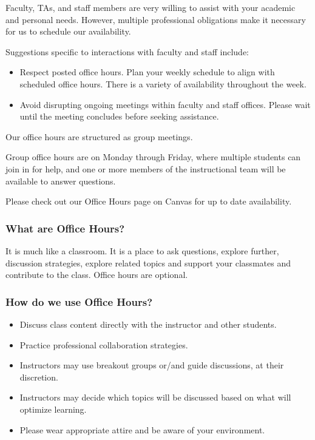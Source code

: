 Faculty, TAs, and staff members are very willing to assist with your academic and personal needs. However, multiple professional obligations make it necessary for us to schedule our availability.

Suggestions specific to interactions with faculty and staff include:

\begin{itemize}
    \item Respect posted office hours.
        Plan your weekly schedule to align with scheduled office hours. There is a variety of availability throughout the week.
    \item Avoid disrupting ongoing meetings within faculty and staff offices.
        Please wait until the meeting concludes before seeking assistance.
\end{itemize}
    

Our office hours are structured as group meetings.

    Group office hours are on Monday through Friday, where multiple students can join in for help, and one or more members of the instructional team will be available to answer questions.

Please check out our Office Hours page on Canvas for up to date availability.

\subsubsection{What are Office Hours?}

    It is much like a classroom. It is a place to ask questions, explore further, discussion strategies, explore related topics and support your classmates and contribute to the class. Office hours are optional.

\subsubsection{How do we use Office Hours?}

\begin{itemize}
    \item Discuss class content directly with the instructor and other students.
    \item Practice professional collaboration strategies.
    \item Instructors may use breakout groups or/and guide discussions, at their discretion.
    \item Instructors may decide which topics will be discussed based on what will optimize learning.
    \item Please wear appropriate attire and be aware of your environment.
\end{itemize}
    
